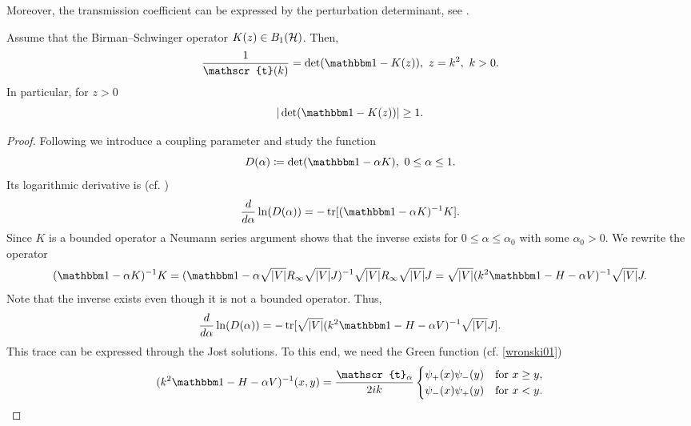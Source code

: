 Moreover, the transmission coefficient can be expressed by the 
perturbation determinant, see \cite{JostPais1951}.

\begin{lemma}\label{jost_pais}
Assume that the Birman--Schwinger operator $K(z)\in B_1({\mathcal H})$. Then,
\begin{equation}\label{jost_pais01}
  \frac{1}{\mathscr{t}(k)} = \det(\id - K(z)),\ z=k^2,\ k>0 .
\end{equation}
In particular, for $z>0$
\begin{equation}\label{jost_pais02}
  |\det(\id-K(z))| \geq 1 .
\end{equation}
\end{lemma}
\begin{proof}
Following \cite[App. A]{Newton1980} we introduce a coupling parameter and study the function
\begin{equation*}
  D(\alpha) \coloneqq \det(\id - \alpha K),\ 0\leq \alpha\leq 1 .
\end{equation*}
Its logarithmic derivative is (cf. \cite[(1.7.10)]{Yafaev1992})
\begin{equation*}
  \frac{d}{d\alpha}\ln(D(\alpha)) = - \tr[ (\id - \alpha K)^{-1}K ] .
\end{equation*}
Since $K$ is a bounded operator a Neumann series argument shows that the inverse 
exists for $0\leq\alpha\leq\alpha_0$ with some $\alpha_0>0$.
We rewrite the operator
\begin{equation*}
  (\id -\alpha K)^{-1}K 
    = (\id - \alpha \sqrt{|V|}R_\infty\sqrt{|V|}J)^{-1} \sqrt{|V|}R_\infty\sqrt{|V|}J
    = \sqrt{|V|}( k^2\id - H-\alpha V)^{-1}\sqrt{|V|}J .
\end{equation*}
Note that the inverse exists even though it is not a bounded operator. Thus,
\begin{equation*}
  \frac{d}{d\alpha} \ln(D(\alpha)) = - \tr[ \sqrt{|V|}(k^2\id - H - \alpha V)^{-1}\sqrt{|V|}J ] .
\end{equation*}
This trace can be expressed through the Jost solutions. To this end, we need the Green function (cf. \eqref{wronski01})
\begin{equation*}
 ( k^2\id - H - \alpha V)^{-1}(x,y) = \frac{\mathscr{t}_\alpha}{2ik}
\begin{cases}
  \psi_+(x)\psi_-(y) & \text{for}\ x\geq y , \\
  \psi_-(x)\psi_+(y) & \text{for}\ x < y .
\end{cases}
\end{equation*}

\end{proof}
